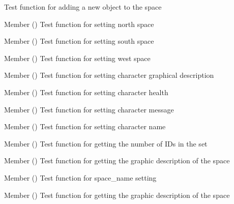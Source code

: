 \begin{DoxyRefList}
%
Test function for adding a new object to the space  
\item[Member \doxylink{space__test_8h_a3bc7fe26c1e36ffd195099a9983206e1}{test2\+\_\+space\+\_\+set\+\_\+north} ()]\label{test__test000124}%
%
Test function for setting north space  
\item[Member \doxylink{space__test_8h_ac9f950741f12ccfcc5ad5d9e71d3d90a}{test2\+\_\+space\+\_\+set\+\_\+south} ()]\label{test__test000126}%
%
Test function for setting south space  
\item[Member \doxylink{space__test_8h_aa51b05ffd99b7bbd8f2dfc23c8f85870}{test2\+\_\+space\+\_\+set\+\_\+west} ()]\label{test__test000130}%
%
Test function for setting west space  
\item[Member \doxylink{character__test_8h_ac0367da4b002568237ddc945069cf3fc}{test3\+\_\+character\+\_\+set\+\_\+gdesc} ()]\label{test__test000022}%
%
Test function for setting character graphical description  
\item[Member \doxylink{character__test_8h_a85cd0fc34102aeb2d93566429da966bd}{test3\+\_\+character\+\_\+set\+\_\+health} ()]\label{test__test000025}%
%
Test function for setting character health  
\item[Member \doxylink{character__test_8h_a595bb5786ee99e4a0aafbd0f729dba5c}{test3\+\_\+character\+\_\+set\+\_\+message} ()]\label{test__test000030}%
%
Test function for setting character message  
\item[Member \doxylink{character__test_8h_a11c8eb53b4606c48acc4ceb2328c38b8}{test3\+\_\+character\+\_\+set\+\_\+name} ()]\label{test__test000019}%
%
Test function for setting character name  
\item[Member \doxylink{set__test_8h_a9a513d21b2c84626100ea3429e359a85}{test3\+\_\+set\+\_\+get\+\_\+nids} ()]\label{test__test000113}%
%
Test function for getting the number of IDs in the set  
\item[Member \doxylink{space__test_8h_a742a027970d2b83dc163584a89c2add9}{test3\+\_\+space\+\_\+get\+\_\+gdesc} ()]\label{test__test000155}%
%
Test function for getting the graphic description of the space  
\item[Member \doxylink{space__test_8h_aa24a337830006e33706ab6ac1c416b47}{test3\+\_\+space\+\_\+set\+\_\+name} ()]\label{test__test000122}%
%
Test function for space\+\_\+name setting  
\item[Member \doxylink{space__test_8h_a6cd2a3d0b45747aeb9aff6ef11ae121a}{test4\+\_\+space\+\_\+get\+\_\+gdesc} ()]\label{test__test000156}%
%
Test function for getting the graphic description of the space 
\end{DoxyRefList}